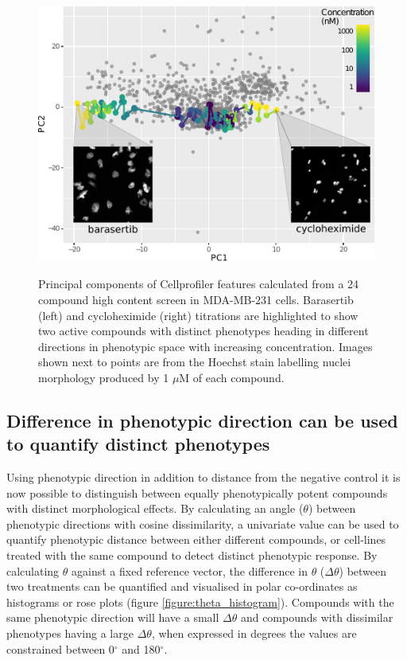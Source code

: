\documentclass[a4paper,11pt,twoside,openright]{scrbook}
\begin{document}
\begin{figure}
    \captionsetup{width=0.8\textwidth}
    \caption[Two compound titrations highlighted in phenotypic space]{
Principal components of Cellprofiler features calculated from a 24 compound high content screen in MDA-MB-231 cells.
Barasertib (left) and cycloheximide (right) titrations are highlighted to show two active compounds with distinct phenotypes heading in different directions in phenotypic space with increasing concentration.
Images shown next to points are from the Hoechst stain labelling nuclei morphology produced by 1 $\mu$M of each compound.
}
    \includegraphics[scale=1.4]{figs/ch3TCCS_direction}
    \label{figure:pca_direction}
\end{figure}


\subsection{Difference in phenotypic direction can be used to quantify distinct phenotypes}

Using phenotypic direction in addition to distance from the negative control it is now possible to distinguish between equally phenotypically potent compounds with distinct morphological effects.
By calculating an angle ($\theta$) between phenotypic directions with cosine dissimilarity, a univariate value can be used to quantify phenotypic distance between either different compounds, or cell-lines treated with the same compound to detect distinct phenotypic response.
By calculating $\theta$ against a fixed reference vector, the difference in $\theta$  ($\Delta\theta$) between two treatments can be quantified and visualised in polar co-ordinates as histograms or rose plots (figure \ref{figure:theta_histogram}).
Compounds with the same phenotypic direction will have a small $\Delta\theta$ and compounds with dissimilar phenotypes having a large $\Delta\theta$, when expressed in degrees the values are constrained between 0$^\circ$ and 180$^\circ$.
\end{document}
